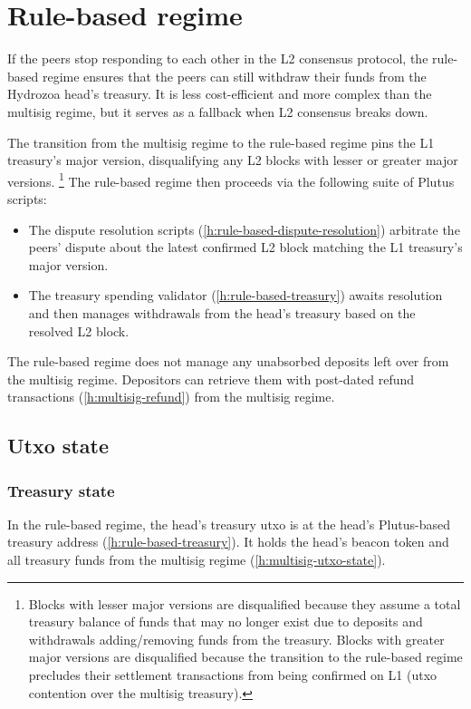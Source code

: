\documentclass[../hydrozoa.tex]{subfiles}
\begin{document}
\section{Rule-based regime}%
\label{h:rule-based-regime}%
If the peers stop responding to each other in the L2 consensus protocol, the rule-based regime ensures that the peers can still withdraw their funds from the Hydrozoa head's treasury.
It is less cost-efficient and more complex than the multisig regime, but it serves as a fallback when L2 consensus breaks down.

The transition from the multisig regime to the rule-based regime pins the L1 treasury's major version, disqualifying any L2 blocks with lesser or greater major versions.%
\footnote{Blocks with lesser major versions are disqualified because they assume a total treasury balance of funds that may no longer exist due to deposits and withdrawals adding/removing funds from the treasury.
  Blocks with greater major versions are disqualified because the transition to the rule-based regime precludes their settlement transactions from being confirmed on L1 (utxo contention over the multisig treasury).}
The rule-based regime then proceeds via the following suite of Plutus scripts:
\begin{itemize}
  \item The dispute resolution scripts (\cref{h:rule-based-dispute-resolution}) arbitrate the peers' dispute about the latest confirmed L2 block matching the L1 treasury's major version.
  \item The treasury spending validator (\cref{h:rule-based-treasury}) awaits resolution and then manages withdrawals from the head's treasury based on the resolved L2 block.
\end{itemize}

The rule-based regime does not manage any unabsorbed deposits left over from the multisig regime.
Depositors can retrieve them with post-dated refund transactions (\cref{h:multisig-refund}) from the multisig regime.

\subsection{Utxo state}%
\label{h:rule-based-utxo-state}

\subsubsection{Treasury state}

In the rule-based regime, the head's treasury utxo is at the head's Plutus-based treasury address (\cref{h:rule-based-treasury}).
It holds the head's beacon token and all treasury funds from the multisig regime (\cref{h:multisig-utxo-state}).
\end{document}
